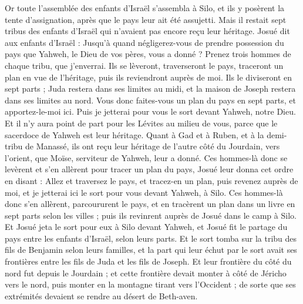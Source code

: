 \begin{multicols}{2}
\VerseOne{}Or toute l'assemblée des enfants d'Israël s'assembla à Silo, et ils y posèrent la tente d'assignation, après que le pays leur ait été assujetti.  
Mais il restait sept tribus des enfants d'Israël qui n'avaient pas encore reçu leur héritage.
Josué dit aux enfants d'Israël : Jusqu'à quand négligerez-vous de prendre possession du pays que Yahweh, le Dieu de vos pères, vous a donné ?
Prenez trois hommes de chaque tribu, que j'enverrai. Ils se lèveront, traverseront le pays, traceront un plan en vue de l'héritage, puis ils reviendront auprès de moi.
Ils le diviseront en sept parts ; Juda restera dans ses limites au midi, et la maison de Joseph restera dans ses limites au nord.
Vous donc faites-vous un plan du pays en sept parts, et apportez-le-moi ici. Puis je jetterai pour vous le sort devant Yahweh, notre Dieu.
Et il n'y aura point de part pour les Lévites au milieu de vous, parce que le sacerdoce de Yahweh est leur héritage. Quant à Gad et à Ruben, et à la demi-tribu de Manassé, ils ont reçu leur héritage de l'autre côté du Jourdain, vers l'orient, que Moïse, serviteur de Yahweh, leur a donné.
Ces hommes-là donc se levèrent et s'en allèrent pour tracer un plan du pays, Josué leur donna cet ordre en disant : Allez et traversez le pays, et tracez-en un plan, puis revenez auprès de moi, et je jetterai ici le sort pour vous devant Yahweh, à Silo.
Ces hommes-là donc s'en allèrent, parcoururent le pays, et en tracèrent un plan dans un livre en sept parts selon les villes ; puis ils revinrent auprès de Josué dans le camp à Silo.
Et Josué jeta le sort pour eux à Silo devant Yahweh, et Josué fit le partage du pays entre les enfants d'Israël, selon leurs parts.
Et le sort tomba sur la tribu des fils de Benjamin selon leurs familles, et la part qui leur échut par le sort avait ses frontières entre les fils de Juda et les fils de Joseph.
Et leur frontière du côté du nord fut depuis le Jourdain ; et cette frontière devait monter à côté de Jéricho vers le nord, puis monter en la montagne tirant vers l'Occident ; de sorte que ses extrémités devaient se rendre au désert de Beth-aven. 

\end{multicols}
